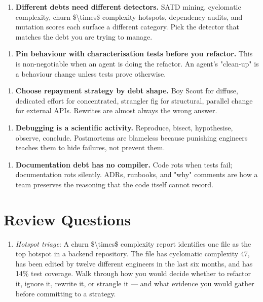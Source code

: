 \documentclass[11pt,a4paper]{book}
\begin{document}
\begin{enumerate}
  \item \textbf{Different debts need different detectors.} SATD mining, cyclomatic complexity, churn \$\textbackslash{}times\$ complexity hotspots, dependency audits, and mutation scores each surface a different category. Pick the detector that matches the debt you are trying to manage.
\end{enumerate}

\begin{enumerate}
  \item \textbf{Pin behaviour with characterisation tests before you refactor.} This is non-negotiable when an agent is doing the refactor. An agent's "clean-up" is a behaviour change unless tests prove otherwise.
\end{enumerate}

\begin{enumerate}
  \item \textbf{Choose repayment strategy by debt shape.} Boy Scout for diffuse, dedicated effort for concentrated, strangler fig for structural, parallel change for external APIs. Rewrites are almost always the wrong answer.
\end{enumerate}

\begin{enumerate}
  \item \textbf{Debugging is a scientific activity.} Reproduce, bisect, hypothesise, observe, conclude. Postmortems are blameless because punishing engineers teaches them to hide failures, not prevent them.
\end{enumerate}

\begin{enumerate}
  \item \textbf{Documentation debt has no compiler.} Code rots when tests fail; documentation rots silently. ADRs, runbooks, and "why" comments are how a team preserves the reasoning that the code itself cannot record.
\end{enumerate}

\medskip

\section{Review Questions}

\begin{enumerate}
  \item \textit{Hotspot triage}: A churn \$\textbackslash{}times\$ complexity report identifies one file as the top hotspot in a backend repository. The file has cyclomatic complexity 47, has been edited by twelve different engineers in the last six months, and has 14\% test coverage. Walk through how you would decide whether to refactor it, ignore it, rewrite it, or strangle it --- and what evidence you would gather before committing to a strategy.
\end{enumerate}
\end{document}
